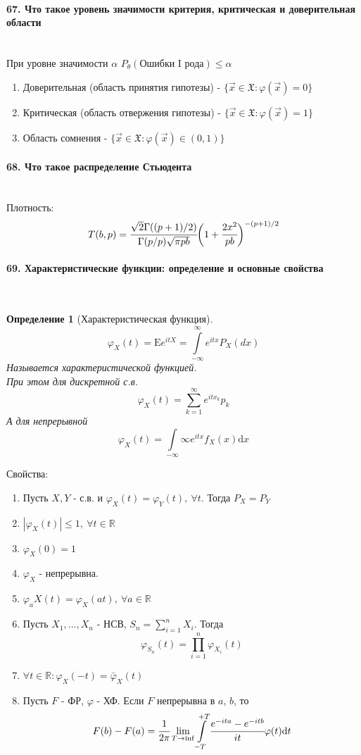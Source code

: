 \documentclass[titlepage]{article}
\newcommand{\sX}{\mathfrak{X}}
\newcommand{\sE}{\mathrm{E}}
\newcommand{\R}{\mathbb{R}} %
\newtheorem{definition}{Определение}
\begin{document}
\paragraph{67. Что такое уровень значимости критерия, критическая и доверительная области} ~\\
При уровне значимости $\alpha$ $P_\theta(\text{Ошибки I рода}) \leq \alpha$
\begin{enumerate}
	\item Доверительная (область принятия гипотезы) - $\{\vec x \in \sX: \varphi(\vec x) = 0\}$
	\item Критическая (область отвержения гипотезы) - $\{\vec x \in \sX: \varphi(\vec x) = 1\}$
	\item Область сомнения - $\{\vec x \in \sX: \varphi(\vec x) \in (0,1)\}$
\end{enumerate}

\paragraph{68. Что такое распределение Стьюдента} ~\\
Плотность:
\[T(b,p)=\cfrac{\sqrt{2}\Gamma((p+1)/2)}{\Gamma(p/p)\sqrt{\pi p b}}\bigg(1+\cfrac{2x^2}{pb}\bigg)^{-(p+1)/2}\]

\paragraph{69. Характеристические функции: определение и основные свойства} ~\\
\begin{definition}[Характеристическая функция]
	\[\varphi_X(t)=\sE e^{itX} = \int\limits_{-\infty}^\infty e^{itx}P_X(dx)\]
	Называется характеристической функцией.\\
	При этом для дискретной с.в.
	\[\varphi_X(t)=\sum_{k=1}^\infty e^{itx_k}p_k\]
	А для непрерывной
	\[\varphi_X(t)=\int\limits_{-\infty}{\infty}e^{itx}f_X(x)\mathrm{d}x\]
\end{definition}
Свойства:
\begin{enumerate}
	\item Пусть $X, Y$ - с.в. и $\varphi_X(t)=\varphi_Y(t),\ \forall t$. Тогда $P_X = P_Y$
	\item $|\varphi_X(t)|\leq 1,\ \forall t \in \R$
	\item $\varphi_X(0) = 1$
	\item $\varphi_X$ - непрерывна.
	\item $\varphi_aX(t) = \varphi_X(at),\ \forall a \in \R$
	\item Пусть $X_1,\dots,X_n$ - НСВ, $S_n = \sum_{i=1}^nX_i$. Тогда
	\[\varphi_{S_n}(t)=\prod_{i=1}^n\varphi_{X_i}(t)\]
	\item $\forall t \in \R: \varphi_X(-t)=\bar\varphi_X(t)$
	\item Пусть $F$ - ФР, $\varphi$ - ХФ. Если $F$ непрерывна в $a$, $b$, то
	\[F(b)-F(a)=\cfrac{1}{2\pi}\lim_{T\rightarrow\inf}\int\limits_{-T}^{+T}\cfrac{e^{-ita}-e^{-itb}}{it}\varphi(t)\mathrm{d}t\]
\end{enumerate}
\end{document}
